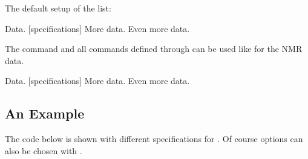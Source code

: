 \documentclass[load-preamble+]{cnltx-doc}
\begin{document}
The default setup of the list:
\begin{sourcecode}
  \topsep\z@skip \partopsep\z@skip 
  \itemsep\z@ \parsep\z@ \itemindent\z@
  \leftmargin\z@
\end{sourcecode}

\begin{example}
  \begin{experimental}[format=\bfseries]
     Data.
    [specifications] More data.
     Even more data.
  \end{experimental}
\end{example}

The command  and all commands defined through 
can be used like  for the NMR data.

\begin{example}
  \begin{experimental}[format=\bfseries,use-equal]
     Data.
    [specifications] More data.
    \NMR Even more data.
  \end{experimental}
\end{example}

\subsection{An Example}

The code below is shown with different specifications for .
Of course options can also be chosen with .
\end{document}
